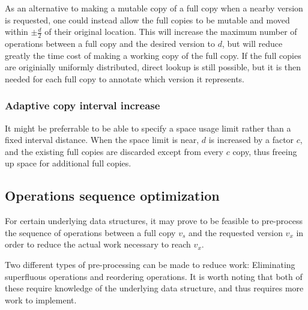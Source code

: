 As an alternative to making a mutable copy of a full copy when a nearby version
is requested, one could instead allow the full copies to be mutable and moved
within $\pm\frac{d}{2}$ of their original location. This will increase the
maximum number of operations between a full copy and the desired version to $d$,
but will reduce greatly the time cost of making a working copy of the full copy.
If the full copies are originially uniformly distributed, direct lookup is still
possible, but it is then needed for each full copy to annotate which version it
represents.

\subsubsection{Adaptive copy interval increase}
It might be preferrable to be able to specify a space usage limit rather than a
fixed interval distance. When the space limit is near, $d$ is increased by a
factor $c$, and the existing full copies are discarded except from every $c$
copy, thus freeing up space for additional full copies.


\subsection{Operations sequence optimization}
For certain underlying data structures, it may prove to be feasible to
pre-process the sequence of operations between a full copy $v_s$ and the
requested version $v_x$ in order to reduce the actual work necessary to reach
$v_x$.

Two different types of pre-processing can be made to reduce work: Eliminating
superfluous operations and reordering operations. It is worth noting that both
of these require knowledge of the underlying data structure, and thus requires
more work to implement.

